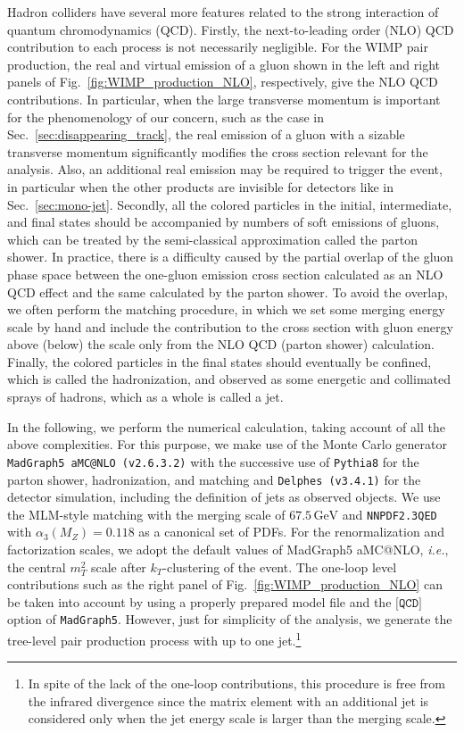 \documentclass[12pt,twoside,book]{article}
\begin{document}
Hadron colliders have several more features related to the strong interaction of quantum chromodynamics (QCD).
Firstly, the next-to-leading order (NLO) QCD contribution to each process is not necessarily negligible.
For the WIMP pair production, the real and virtual emission of a gluon shown in the left and right panels of Fig.~\ref{fig:WIMP_production_NLO}, respectively, give the NLO QCD contributions.
In particular, when the large transverse momentum is important for the phenomenology of our concern, such as the case in Sec.~\ref{sec:disappearing_track}, the real emission of a gluon with a sizable transverse momentum significantly modifies the cross section relevant for the analysis.
Also, an additional real emission may be required to trigger the event, in particular when the other products are invisible for detectors like in Sec.~\ref{sec:mono-jet}.
Secondly, all the colored particles in the initial, intermediate, and final states should be accompanied by numbers of soft emissions of gluons, which can be treated by the semi-classical approximation called the parton shower.
In practice, there is a difficulty caused by the partial overlap of the gluon phase space between the one-gluon emission cross section calculated as an NLO QCD effect and the same calculated by the parton shower.
To avoid the overlap, we often perform the matching procedure, in which we set some merging energy scale by hand and include the contribution to the cross section with gluon energy above (below) the scale only from the NLO QCD (parton shower) calculation.
Finally, the colored particles in the final states should eventually be confined, which is called the hadronization, and observed as some energetic and collimated sprays of hadrons, which as a whole is called a jet.

In the following, we perform the numerical calculation, taking account of all the above complexities.
For this purpose, we make use of the Monte Carlo generator \texttt{MadGraph5 aMC@NLO (v2.6.3.2)} \cite{Alwall:2011uj,Alwall:2014hca} with the successive use of \texttt{Pythia8} \cite{Sjostrand:2014zea} for the parton shower, hadronization, and matching and \texttt{Delphes (v3.4.1)} \cite{deFavereau:2013fsa} for the detector simulation, including the definition of jets as observed objects.
We use the MLM-style matching \cite{Mangano:2006rw} with the merging scale of $67.5\,\mathrm{GeV}$ and \texttt{NNPDF2.3QED} with $\alpha_3 (M_Z) = 0.118$ \cite{Ball:2013hta} as a canonical set of PDFs.
For the renormalization and factorization scales, we adopt the default values of MadGraph5 aMC@NLO, \textit{i.e.}, the central $m^2_T$ scale after $k_T$-clustering of the event.
The one-loop level contributions such as the right panel of Fig.~\ref{fig:WIMP_production_NLO} can be taken into account by using a properly prepared model file and the $\texttt{[QCD]}$ option of \texttt{MadGraph5}.
However, just for simplicity of the analysis, we generate the tree-level pair production process with up to one jet.\footnote{
  In spite of the lack of the one-loop contributions, this procedure is free from the infrared divergence since the matrix element with an additional jet is considered only when the jet energy scale is larger than the merging scale.
}
\end{document}
